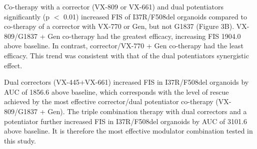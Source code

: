 Co-therapy with a corrector (VX-809 or VX-661) and dual potentiators significantly (p $<$ 0.01) increased FIS of I37R/F508del organoids compared to co-therapy of a corrector with VX-770 or Gen, but not G1837 (Figure 3B). VX-809/G1837 + Gen co-therapy had the greatest efficacy, increasing FIS 1904.0 above baseline. In contrast, corrector/VX-770 + Gen co-therapy had the least efficacy. This trend was consistent with that of the dual potentiators synergistic effect.

Dual correctors (VX-445+VX-661) increased FIS in I37R/F508del organoids by AUC of 1856.6 above baseline, which corresponds with the level of rescue achieved by the most effective corrector/dual potentiator co-therapy (VX-809/G1837 + Gen). The triple combination therapy with dual correctors and a potentiator further increased FIS in I37R/F508del organoids by AUC of 3101.6 above baseline. It is therefore the most effective modulator combination tested in this study.

